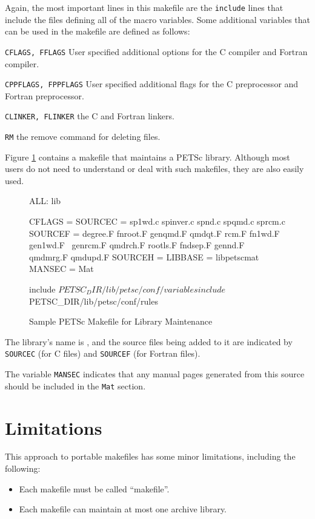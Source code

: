 {{Again, the most important lines in this makefile are the \lstinline{include}
lines that include the files defining all of the macro variables.
Some additional variables that can be used in the makefile are defined
as follows:
\begin{tightitemize}
\item \lstinline{CFLAGS, FFLAGS} User specified additional options for the C compiler and
        Fortran compiler.
\item \lstinline{CPPFLAGS, FPPFLAGS} User specified additional flags for the C preprocessor
        and Fortran preprocessor.
\item \lstinline{CLINKER, FLINKER} the C and Fortran linkers.
\item \lstinline{RM} the remove command for deleting files.
\end{tightitemize}

Figure \ref{fig_make3} contains a makefile that maintains a PETSc
library.  Although most users do not need to understand or deal with such
makefiles, they are also easily used.
\begin{figure}[H]
\begin{makelisting}
ALL: lib

CFLAGS   =
SOURCEC  = sp1wd.c spinver.c spnd.c spqmd.c sprcm.c
SOURCEF  = degree.F  fnroot.F genqmd.F qmdqt.F rcm.F fn1wd.F gen1wd.F \ 
          genrcm.F qmdrch.F rootls.F fndsep.F gennd.F qmdmrg.F qmdupd.F
SOURCEH  = 
LIBBASE  = libpetscmat
MANSEC   = Mat

include ${PETSC_DIR}/lib/petsc/conf/variables
include ${PETSC_DIR}/lib/petsc/conf/rules
\end{makelisting}
\caption{Sample PETSc Makefile for Library Maintenance}
\label{fig_make3}
\end{figure}

The library's name is , and the source files being added
to it are indicated by \lstinline{SOURCEC} (for C files) and \lstinline{SOURCEF} (for
Fortran files).

The variable \lstinline{MANSEC} indicates that any manual pages generated
from this source should be included in the \lstinline{Mat} section.

\section{Limitations}

This approach to portable makefiles has some minor limitations, including
the following:
\begin{itemize}
\item Each makefile must be called ``makefile''.
\item Each makefile can maintain at most one archive library.
\end{itemize}

}}
